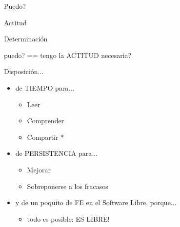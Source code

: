 \documentclass[xcolor=dvipsnames, pdf]{beamer}
\begin{document}
\begin{section}
  {Puedo?}
  
  \begin{subsection}
    {Actitud}
    
    \begin{frame}
      {Determinaci\'{o}n}
      \begin{center}puedo? == tengo la ACTITUD necesaria?\end{center}
    \end{frame}

    \begin{frame}
      {Disposici\'{o}n...}
      
      \begin{itemize}
      \item<2,5> de TIEMPO para...          
        \begin{itemize}
        \item<2,5> Leer
        \item<2,5> Comprender
        \item<2,5> Compartir *
        \end{itemize}

      \item<3,5> de PERSISTENCIA para...        
        \begin{itemize}
        \item<3,5> Mejorar
        \item<3,5> Sobreponerse a los fracasos
        \end{itemize}

      \item<4,5> y de un poquito de FE en el Software Libre, porque...

        \begin{itemize}
        \item<4,5> todo es posible: ES LIBRE!
        \end{itemize}
      \end{itemize}
    \end{frame}
  \end{subsection}
\end{section}
\end{document}
